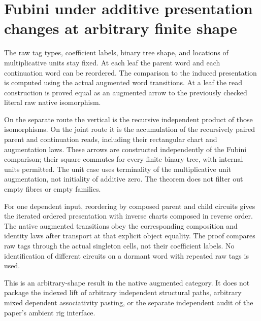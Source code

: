 \documentclass{article}
\begin{document}
\section*{Fubini under additive presentation changes at arbitrary finite shape}
The raw tag types, coefficient labels, binary tree shape, and
locations of multiplicative units stay fixed. At each leaf the
parent word and each continuation word can be reordered. The
comparison to the induced presentation is computed using the
actual augmented word transitions. At a leaf the read construction
is proved equal as an augmented arrow to the previously checked
literal raw native isomorphism.

On the separate route the vertical is the recursive independent
product of those isomorphisms. On the joint route it is the
accumulation of the recursively paired parent and continuation
reads, including their rectangular chart and augmentation laws.
These arrows are constructed independently of the Fubini comparison;
their square commutes for every finite binary tree, with internal
units permitted. The unit case uses terminality of the
multiplicative unit augmentation, not initiality of additive zero.
The theorem does not filter out empty fibres or empty families.

For one dependent input, reordering by composed parent and child
circuits gives the iterated ordered presentation with inverse
charts composed in reverse order. The native augmented transitions
obey the corresponding composition and identity laws after
transport at that explicit object equality. The proof compares
raw tags through the actual singleton cells, not their coefficient
labels. No identification of different circuits on a dormant word
with repeated raw tags is used.

This is an arbitrary-shape result in the native augmented
category. It does not package the indexed lift of arbitrary
independent structural paths, arbitrary mixed dependent
associativity pasting, or the separate independent audit of the
paper's ambient rig interface.
\end{document}

